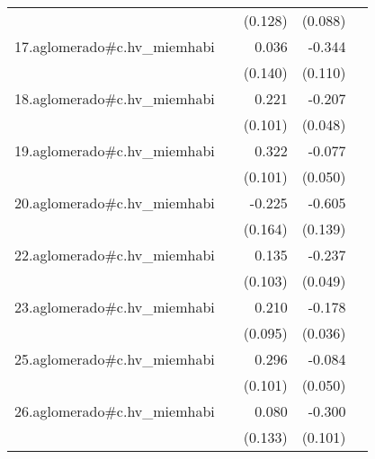 {\begin{longtable}{l*{4}{D{.}{.}{-1}}}
            &                     &     (0.128)         &     (0.088)         &                     \\
\addlinespace
17.aglomerado#c.hv\_miemhabi&                     &       0.036         &      -0.344\sym{**} &                     \\
            &                     &     (0.140)         &     (0.110)         &                     \\
\addlinespace
18.aglomerado#c.hv\_miemhabi&                     &       0.221\sym{*}  &      -0.207\sym{***}&                     \\
            &                     &     (0.101)         &     (0.048)         &                     \\
\addlinespace
19.aglomerado#c.hv\_miemhabi&                     &       0.322\sym{**} &      -0.077         &                     \\
            &                     &     (0.101)         &     (0.050)         &                     \\
\addlinespace
20.aglomerado#c.hv\_miemhabi&                     &      -0.225         &      -0.605\sym{***}&                     \\
            &                     &     (0.164)         &     (0.139)         &                     \\
\addlinespace
22.aglomerado#c.hv\_miemhabi&                     &       0.135         &      -0.237\sym{***}&                     \\
            &                     &     (0.103)         &     (0.049)         &                     \\
\addlinespace
23.aglomerado#c.hv\_miemhabi&                     &       0.210\sym{*}  &      -0.178\sym{***}&                     \\
            &                     &     (0.095)         &     (0.036)         &                     \\
\addlinespace
25.aglomerado#c.hv\_miemhabi&                     &       0.296\sym{**} &      -0.084         &                     \\
            &                     &     (0.101)         &     (0.050)         &                     \\
\addlinespace
26.aglomerado#c.hv\_miemhabi&                     &       0.080         &      -0.300\sym{**} &                     \\
            &                     &     (0.133)         &     (0.101)         &                     \\

\end{longtable}}
